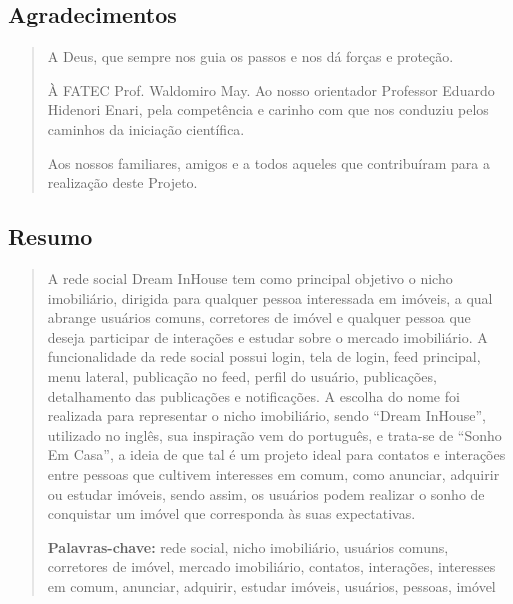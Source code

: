 \documentclass[a4paper,12pt]{article}
\begin{document}
\pagebreak
\begin{centering}
    \section*{Agradecimentos}
    \begin{quotation}
        A Deus, que sempre nos guia os passos e nos dá forças e proteção. 

        À FATEC Prof. Waldomiro May. Ao nosso orientador Professor Eduardo Hidenori Enari, pela competência e carinho com que nos conduziu pelos caminhos da iniciação científica. 
        
        Aos nossos familiares, amigos e a todos aqueles que contribuíram para a realização deste Projeto. 
    \end{quotation}
\end{centering}
\begin{centering}
    \section*{Resumo}
    \begin{quotation}
        A rede social Dream InHouse tem como principal objetivo o nicho imobiliário, dirigida para qualquer pessoa interessada em imóveis, a qual abrange usuários comuns, corretores de imóvel e qualquer pessoa que deseja participar de interações e estudar sobre o mercado imobiliário. A funcionalidade da rede social possui login, tela de login, feed principal, menu lateral, publicação no feed, perfil do usuário, publicações, detalhamento das publicações e notificações. A escolha do nome foi realizada para representar o nicho imobiliário, sendo “Dream InHouse”, utilizado no inglês, sua inspiração vem do português, e trata-se de “Sonho Em Casa”, a ideia de que tal é um projeto ideal para contatos e interações entre pessoas que cultivem interesses em comum, como anunciar, adquirir ou estudar imóveis, sendo assim, os usuários podem realizar o sonho de conquistar um imóvel que corresponda às suas expectativas.

        \textbf{Palavras-chave:} rede social, nicho imobiliário, usuários comuns, corretores de imóvel, mercado imobiliário, contatos, interações, interesses em comum, anunciar, adquirir, estudar imóveis, usuários, pessoas, imóvel
    \end{quotation}
\end{centering}
\end{document}
